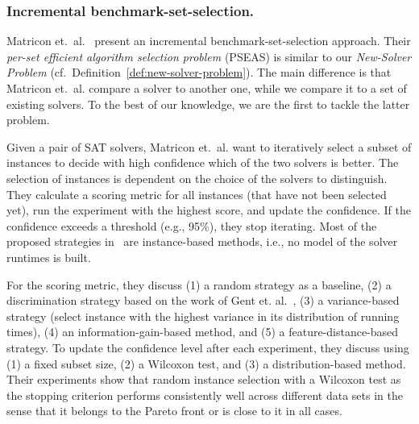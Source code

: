 \documentclass[runningheads]{llncs}
\begin{document}
\subsubsection{Incremental benchmark-set-selection.}
Matricon et.~al.~\cite{MatriconAFSH21} present an incremental benchmark-set-selection approach.
Their \emph{per-set efficient algorithm selection problem} (PSEAS) is similar to our \emph{New-Solver Problem} (cf.~Definition~\ref{def:new-solver-problem}).
The main difference is that Matricon et.~al. compare a solver to another one, while we compare it to a set of existing solvers.
To the best of our knowledge, we are the first to tackle the latter problem.

Given a pair of SAT solvers, Matricon et.~al. want to iteratively select a subset of instances to decide with high confidence which of the two solvers is better.
The selection of instances is dependent on the choice of the solvers to distinguish.
They calculate a scoring metric for all instances (that have not been selected yet), run the experiment with the highest score, and update the confidence.
If the confidence exceeds a threshold (e.g., 95\%), they stop iterating.
Most of the proposed strategies in~\cite{MatriconAFSH21} are instance-based methods, i.e., no model of the solver runtimes is built.

For the scoring metric, they discuss (1) a random strategy as a baseline, (2) a discrimination strategy based on the work of Gent et. al.~\cite{GentHJKMNN14}, (3) a variance-based strategy (select instance with the highest variance in its distribution of running times), (4) an information-gain-based method, and (5) a feature-distance-based strategy.
To update the confidence level after each experiment, they discuss using (1) a fixed subset size, (2) a Wilcoxon test, and (3) a distribution-based method.
Their experiments show that random instance selection with a Wilcoxon test as the stopping criterion performs consistently well across different data sets in the sense that it belongs to the Pareto front or is close to it in all cases.
\end{document}

